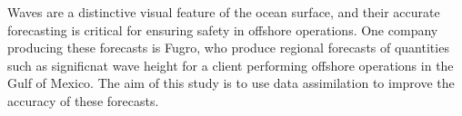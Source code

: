 \documentclass[
11pt, %
english, %
onehalfspacing, %
parskip, %
headsepline, %
]{MastersDoctoralThesis} %
\let \cleardoublepage \clearpage
\begin{document}
%
% 
% 
%





Waves are a distinctive visual feature of the ocean surface, and their accurate forecasting is critical for ensuring safety in offshore operations. One company producing these forecasts is Fugro, who produce regional forecasts of quantities such as significnat wave height for a client performing offshore operations in the Gulf of Mexico. The aim of this study is to use data assimilation to improve the accuracy of these forecasts.
\end{document}
